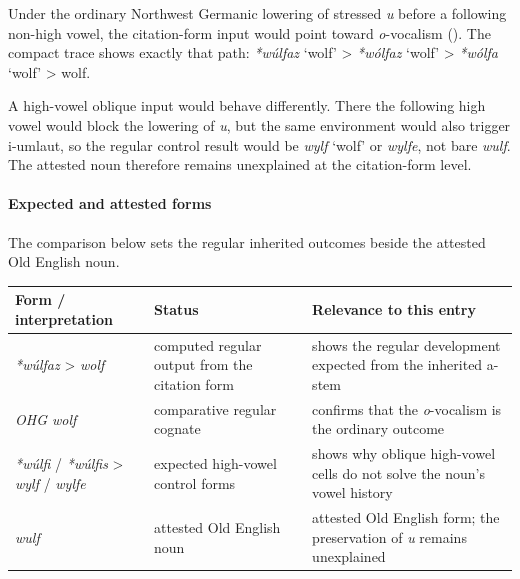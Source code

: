 \documentclass[
  british,
  a4paper,
]{article}
\newcounter{none} %
\providecommand{\Recon}[1]{\emph{*#1}}
\begin{document}
Under the ordinary Northwest Germanic lowering of stressed \emph{u}
before a following non-high vowel, the citation-form input would point
toward \emph{o}-vocalism (). The compact trace shows exactly that path:
\Recon{wúlfaz} `wolf' \textgreater{} \Recon{wólfaz} `wolf'
\textgreater{} \Recon{wólfa} `wolf' \textgreater{} wolf.

A high-vowel oblique input would behave differently. There the following
high vowel would block the lowering of \emph{u}, but the same
environment would also trigger i-umlaut, so the regular control result
would be {\emph{wylf}} `wolf' or \emph{wylfe}, not bare \emph{wulf}. The
attested noun therefore remains unexplained at the citation-form level.

\paragraph{Expected and attested
forms}\label{expected-and-attested-forms-2}

The comparison below sets the regular inherited outcomes beside the
attested Old English noun.

{\def\LTcaptype{none} %
\begin{longtable}[]{@{}
  >{\raggedright\arraybackslash}p{}
  >{\raggedright\arraybackslash}p{}
  >{\raggedright\arraybackslash}p{}@{}}
\toprule\noalign{}
\begin{minipage}[b]{\linewidth}\raggedright
Form / interpretation
\end{minipage} & \begin{minipage}[b]{\linewidth}\raggedright
Status
\end{minipage} & \begin{minipage}[b]{\linewidth}\raggedright
Relevance to this entry
\end{minipage} \\
\midrule\noalign{}
\endhead
\bottomrule\noalign{}
\endlastfoot
\emph{*wúlfaz} \textgreater{} \emph{wolf} & computed regular output from
the citation form & shows the regular development expected from the
inherited a-stem \\
\emph{OHG wolf} & comparative regular cognate & confirms that the
\emph{o}-vocalism is the ordinary outcome \\
\emph{*wúlfi} / \emph{*wúlfis} \textgreater{} \emph{wylf} / \emph{wylfe}
& expected high-vowel control forms & shows why oblique high-vowel cells
do not solve the noun's vowel history \\
\emph{wulf} & attested Old English noun & attested Old English form; the
preservation of \emph{u} remains unexplained \\
\end{longtable}
}
\end{document}
